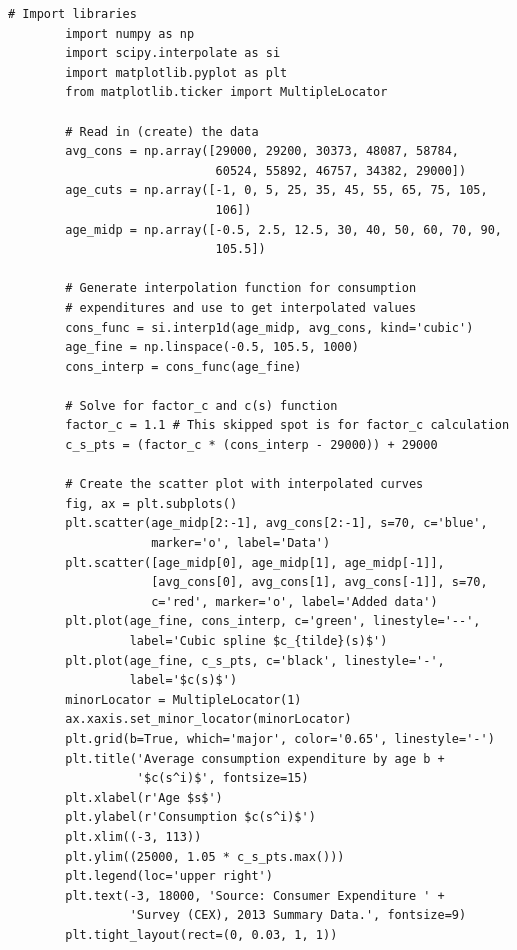 \documentclass[letterpaper,12pt]{article}
\theoremstyle{definition}
\begin{document}
      \vspace{5mm}
      \begin{lstlisting}[frame=single]
        # Import libraries
        import numpy as np
        import scipy.interpolate as si
        import matplotlib.pyplot as plt
        from matplotlib.ticker import MultipleLocator

        # Read in (create) the data
        avg_cons = np.array([29000, 29200, 30373, 48087, 58784,
                             60524, 55892, 46757, 34382, 29000])
        age_cuts = np.array([-1, 0, 5, 25, 35, 45, 55, 65, 75, 105,
                             106])
        age_midp = np.array([-0.5, 2.5, 12.5, 30, 40, 50, 60, 70, 90,
                             105.5])

        # Generate interpolation function for consumption
        # expenditures and use to get interpolated values
        cons_func = si.interp1d(age_midp, avg_cons, kind='cubic')
        age_fine = np.linspace(-0.5, 105.5, 1000)
        cons_interp = cons_func(age_fine)

        # Solve for factor_c and c(s) function
        factor_c = 1.1 # This skipped spot is for factor_c calculation
        c_s_pts = (factor_c * (cons_interp - 29000)) + 29000

        # Create the scatter plot with interpolated curves
        fig, ax = plt.subplots()
        plt.scatter(age_midp[2:-1], avg_cons[2:-1], s=70, c='blue',
                    marker='o', label='Data')
        plt.scatter([age_midp[0], age_midp[1], age_midp[-1]],
                    [avg_cons[0], avg_cons[1], avg_cons[-1]], s=70,
                    c='red', marker='o', label='Added data')
        plt.plot(age_fine, cons_interp, c='green', linestyle='--',
                 label='Cubic spline $c_{tilde}(s)$')
        plt.plot(age_fine, c_s_pts, c='black', linestyle='-',
                 label='$c(s)$')
        minorLocator = MultipleLocator(1)
        ax.xaxis.set_minor_locator(minorLocator)
        plt.grid(b=True, which='major', color='0.65', linestyle='-')
        plt.title('Average consumption expenditure by age b +
                  '$c(s^i)$', fontsize=15)
        plt.xlabel(r'Age $s$')
        plt.ylabel(r'Consumption $c(s^i)$')
        plt.xlim((-3, 113))
        plt.ylim((25000, 1.05 * c_s_pts.max()))
        plt.legend(loc='upper right')
        plt.text(-3, 18000, 'Source: Consumer Expenditure ' +
                 'Survey (CEX), 2013 Summary Data.', fontsize=9)
        plt.tight_layout(rect=(0, 0.03, 1, 1))
      \end{lstlisting}
\end{document}
